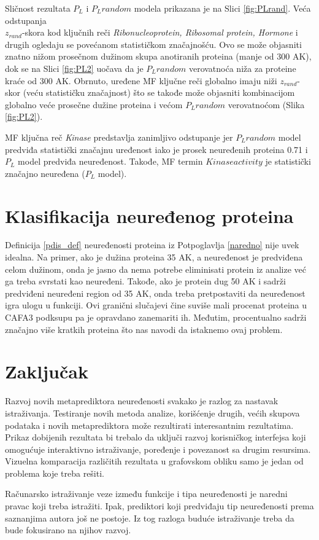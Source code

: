 Sličnost rezultata $P_L$ i $P_L random$ modela prikazana je na Slici
\ref{fig:PLrand}. Veća odstupanja \\$z_{rand}$-skora kod ključnih reči
\textit{Ribonucleoprotein, Ribosomal protein, Hormone} i drugih ogledaju se
povećanom statističkom značajnošću. Ovo se može objasniti znatno
nižom prosečnom dužinom skupa anotiranih proteina (manje od 300 AK), dok se na
Slici \ref{fig:PL2} uočava da je $P_L random$ verovatnoća niža za proteine
kraće od 300 AK.  Obrnuto, uređene MF ključne reči globalno imaju niži
$z_{rand}$-skor (veću statističku značajnost) što se takođe može objasniti
kombinacijom globalno veće prosečne dužine proteina i većom $P_L random$
verovatnoćom (Slika \ref{fig:PL2}). 

MF ključna reč \textit{Kinase} predstavlja zanimljivo odstupanje jer $P_L
random$ model predviđa statistički značajnu uređenost iako je prosek neuređenih
proteina 0.71 i $P_L$ model predviđa neuređenost. Takođe, MF termin $Kinase
activity$ je statistički značajno neuređena ($P_L$ model).

\section{Klasifikacija neuređenog proteina}

Definicija \ref{pdis_def} neuređenosti proteina iz Potpoglavlja
\ref{naredno} nije uvek idealna.  Na primer, ako je dužina proteina 35 AK, a
neuređenost je predviđena celom dužinom, onda je jasno da nema potrebe eliminisati
protein iz analize već ga treba svrstati kao neuređeni.  Takođe, ako je protein
dug 50 AK i sadrži predviđeni neuređeni region od 35 AK, onda treba
pretpostaviti da neuređenost igra ulogu u funkciji. Ovi granični slučajevi čine
suviše mali procenat proteina u CAFA3 podksupu pa je opravdano zanemariti ih.
Međutim, procentualno \swissprot sadrži značajno više kratkih proteina što nas
navodi da istaknemo ovaj problem.

\section{Zaključak}

Razvoj novih metaprediktora neuređenosti \cite{Meng_c2017} svakako je razlog za
nastavak istraživanja. Testiranje novih metoda analize, korišćenje drugih,
većih skupova podataka i novih metaprediktora može rezultirati interesantnim
rezultatima. Prikaz dobijenih rezultata bi trebalo da uključi razvoj
korisničkog interfejsa koji omogućuje interaktivno istraživanje, poređenje i
povezanost sa drugim resursima. Vizuelna komparacija različitih rezultata u
grafovskom obliku samo je jedan od problema koje treba rešiti.

Računarsko istraživanje veze između funkcije i tipa neuređenosti je naredni
pravac koji treba istražiti. Ipak, prediktori koji predviđaju tip neuređenosti
prema saznanjima autora još ne postoje. Iz tog razloga buduće istraživanje
treba da bude fokusirano na njihov razvoj.

